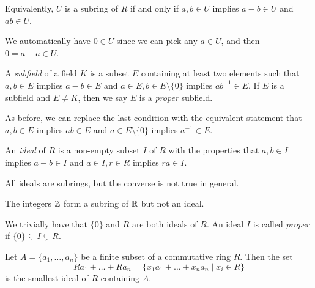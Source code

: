 \begin{remark}
  Equivalently, $U$ is a subring of $R$ if and only
  if $a, b \in U$ implies $a - b \in U$ and $ab \in U$.
\end{remark}

\begin{remark}
  We automatically have $0 \in U$ since we can pick
  any $a \in U$, and then $0 = a - a \in U$.
\end{remark}

\begin{definition}[Subfield]
  A \emph{subfield} of a field $K$ is a subset $E$
  containing at least two elements such that
  $a, b \in E$ implies $a - b \in E$ and $a \in E, b \in E \setminus \{0\}$ implies $ab^{-1} \in E$. If $E$ is
  a subfield and $E \ne K$, then we say $E$ is a
  \emph{proper} subfield.
\end{definition}

\begin{remark}
  As before, we can replace the last condition with
  the equivalent statement that
  $a, b \in E$ implies $ab \in E$ and
  $a \in E \setminus \{0\}$ implies $a^{-1} \in E$.
\end{remark}

\begin{definition}[Ideal]
  An \emph{ideal} of $R$ is a non-empty subset $I$ of
  $R$ with the properties that $a, b \in I$ implies
  $a - b \in I$ and $a \in I, r \in R$ implies $ra \in I$.
\end{definition}

\begin{remark}
  All ideals are subrings, but the converse is not
  true in general.
\end{remark}

\begin{example}
  The integers $\mathbb{Z}$ form a subring of $\mathbb{R}$ but not an
  ideal.
\end{example}

\begin{remark}
  We trivially have that $\{0\}$ and $R$ are both
  ideals of $R$. An ideal $I$ is called \emph{proper}
  if $\{0\} \subsetneq I \subsetneq R$.
\end{remark}

\begin{tcolorbox}
\begin{theorem}
  Let $A = \{a_1, \dots, a_n\}$ be a finite subset
  of a commutative ring $R$. Then the set
  \[Ra_1 + \dots + Ra_n = \{x_1 a_1 + \dots + x_n a_n \mid x_i \in R\}\]
  is the smallest ideal of $R$ containing $A$.
\end{theorem}
\end{tcolorbox}

